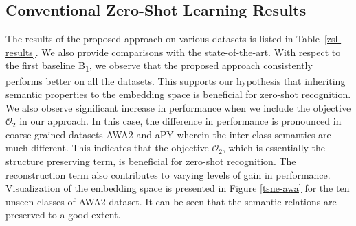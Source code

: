 \documentclass[10pt,twocolumn,letterpaper]{article}
\begin{document}
\subsection{Conventional Zero-Shot Learning Results}
The results of the proposed approach on various datasets is listed in Table~\ref{zsl-results}. 
We also provide comparisons with the state-of-the-art. 
With respect to the first baseline B\textsubscript{1}, we observe that the proposed approach consistently performs better on all the datasets. 
This supports our hypothesis that inheriting semantic properties to the embedding space is beneficial for zero-shot recognition.  
We also observe significant increase in performance when we include the objective $\mathcal{O}_2$ in our approach.
In this case, the difference in performance is pronounced in coarse-grained datasets AWA2 and aPY wherein the inter-class semantics are much different. 
This indicates that the objective $\mathcal{O}_2$, which is essentially the structure preserving term, is beneficial for zero-shot recognition. 
The reconstruction term also contributes to varying levels of gain in performance. Visualization of the embedding space is presented in Figure \ref{tsne-awa} for the ten unseen classes of AWA2 dataset. It can be seen that the semantic relations are preserved to a good extent. 
\end{document}
